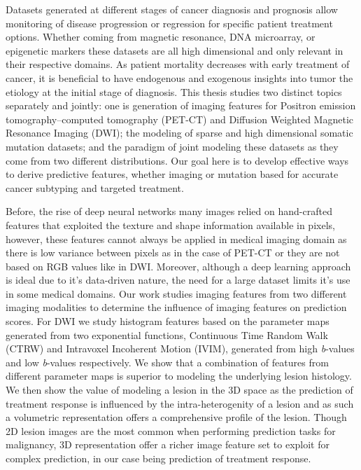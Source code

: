 Datasets generated at different stages of cancer diagnosis and prognosis allow monitoring of disease progression or regression for specific patient treatment options.  Whether coming from magnetic resonance, DNA microarray, or epigenetic markers these datasets are all high dimensional and only relevant in their respective domains.  As patient mortality decreases with early treatment of cancer, it is beneficial to have endogenous and exogenous insights into tumor the etiology at the initial stage of diagnosis.  This thesis studies two distinct topics separately and jointly: one is generation of imaging features for Positron emission tomography–computed tomography (PET-CT) and  Diffusion Weighted Magnetic Resonance Imaging (DWI); the modeling of sparse and high dimensional somatic mutation datasets; and the paradigm of joint modeling these datasets as they come from two different distributions.  Our goal here is to develop effective ways to derive predictive features, whether imaging or mutation based for accurate cancer subtyping and targeted treatment.
    
Before, the rise of deep neural networks many images relied on hand-crafted features that exploited the texture and shape information available in pixels, however, these features cannot always be applied in medical imaging domain as there is low variance between pixels as in the case of PET-CT or they are not based on RGB values like in DWI.  Moreover, although a deep learning approach is ideal due to it's data-driven nature, the need for a large dataset limits it's use in some medical domains.  Our work studies imaging features from two different imaging modalities to determine the influence of imaging features on prediction scores.  For DWI we study histogram features based on the parameter maps generated from two exponential functions, Continuous Time Random Walk (CTRW) and Intravoxel Incoherent Motion (IVIM), generated from high \textit{b}-values and low \textit{b}-values respectively.  We show that a combination of features from different parameter maps is superior to modeling the underlying lesion histology.  We then show the value of modeling a lesion in the 3D space as the prediction of treatment response is influenced by the intra-heterogenity of a lesion and as such a volumetric representation offers a comprehensive profile of the lesion.  Though 2D lesion images are the most common when performing prediction tasks for malignancy, 3D representation offer a richer image feature set to exploit for complex prediction, in our case being prediction of treatment response.

